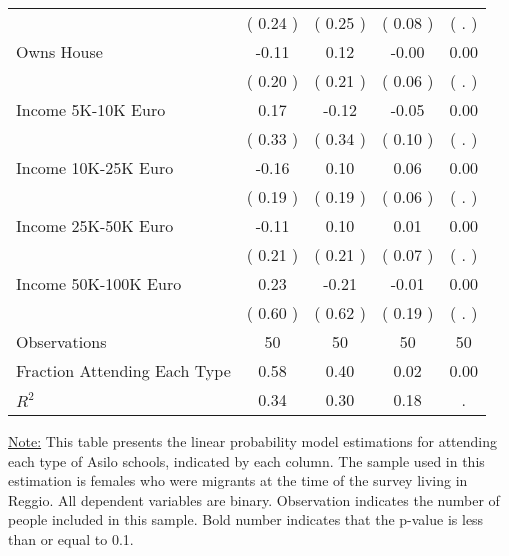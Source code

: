 \begin{table}[H]
{\begin{tabular}{lcccc}
\quad  & (     0.24 ) & (     0.25 )  & (     0.08 )  & (        . )  \\
\quad Owns House &     -0.11 &      0.12 &     -0.00 &      0.00 \\
\quad  & (     0.20 ) & (     0.21 )  & (     0.06 )  & (        . )  \\
\quad Income 5K-10K Euro &      0.17 &     -0.12 &     -0.05 &      0.00 \\
\quad  & (     0.33 ) & (     0.34 )  & (     0.10 )  & (        . )  \\
\quad Income 10K-25K Euro &     -0.16 &      0.10 &      0.06 &      0.00 \\
\quad  & (     0.19 ) & (     0.19 )  & (     0.06 )  & (        . )  \\
\quad Income 25K-50K Euro &     -0.11 &      0.10 &      0.01 &      0.00 \\
\quad  & (     0.21 ) & (     0.21 )  & (     0.07 )  & (        . )  \\
\quad Income 50K-100K Euro &      0.23 &     -0.21 &     -0.01 &      0.00 \\
\quad  & (     0.60 ) & (     0.62 )  & (     0.19 )  & (        . )  \\
\midrule
Observations & 50 & 50 & 50 & 50 \\
Fraction Attending Each Type &      0.58 &      0.40 &      0.02 &      0.00 \\
\midrule
$ R^2$ &      0.34 &      0.30 &      0.18 &         . \\
\bottomrule
\end{tabular}}
\end{table}
\begin{footnotesize}
\noindent\underline{Note:} This table presents the linear probability model estimations for attending each type of Asilo schools, indicated by each column. The sample used in this estimation is females who were migrants at the time of the survey living in Reggio. All dependent variables are binary. Observation indicates the number of people included in this sample. Bold number indicates that the p-value is less than or equal to 0.1.
\end{footnotesize}

